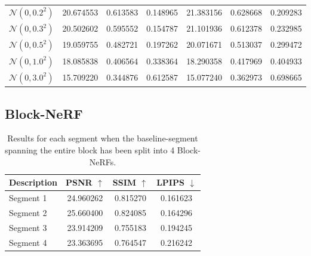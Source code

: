 \begin{table}[H]
\begin{tabular}{l | C{2.2} C{1.3} C{1.3} | C{2.2} C{1.3} C{1.3}}
$\mathcal{N}(0, 0.2^2)$ & 20.674553 & 0.613583 & 0.148965 & 21.383156 & 0.628668 & 0.209283 \\ 
$\mathcal{N}(0, 0.3^2)$ & 20.502602 & 0.595552 & 0.154787 & 21.101936 & 0.612378 & 0.232985 \\ 
$\mathcal{N}(0, 0.5^2)$ & 19.059755 & 0.482721 & 0.197262 & 20.071671 & 0.513037 & 0.299472 \\ 
$\mathcal{N}(0, 1.0^2)$ & 18.085838 & 0.406564 & 0.338364 & 18.290358 & 0.417969 & 0.404933 \\ 
$\mathcal{N}(0, 3.0^2)$ & 15.709220 & 0.344876 & 0.612587 & 15.077240 & 0.362973 & 0.698665 \\ 
\hline
\end{tabular}
\end{table}

\subsection{Block-NeRF}

\begin{table}[H]
\caption[Full results for experiment 4: Block-NeRF on 4-segment dataset]{Results for each segment when the baseline-segment spanning the entire block has been split into 4 Block-NeRFs.}
\label{tab:block-nerf-four-segments-full}
\centering
\setlength{\tabcolsep}{6pt}
\renewcommand{\arraystretch}{1.5}
\begin{tabular}{l | C{2.2} C{1.3} C{1.3}}
\hline
\textbf{Description} & \textbf{PSNR $\uparrow$} & \textbf{SSIM $\uparrow$} & \textbf{LPIPS $\downarrow$} \\
\hline
Segment 1 & 24.960262 & 0.815270 & 0.161623 \\
Segment 2 & 25.660400 & 0.824085 & 0.164296 \\
Segment 3 & 23.914209 & 0.755183 & 0.194245 \\
Segment 4 & 23.363695 & 0.764547 & 0.216242 \\
\hline
\end{tabular}
\end{table}


